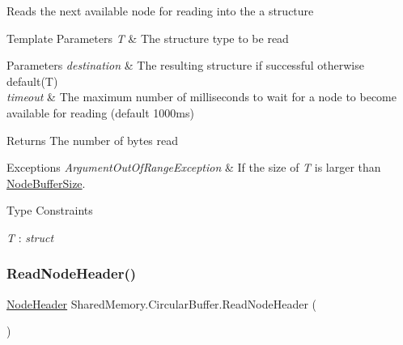 Reads the next available node for reading into the a structure 


\begin{DoxyTemplParams}{Template Parameters}
{\em T} & The structure type to be read\\
\hline
\end{DoxyTemplParams}

\begin{DoxyParams}{Parameters}
{\em destination} & The resulting structure if successful otherwise default(\+T)\\
\hline
{\em timeout} & The maximum number of milliseconds to wait for a node to become available for reading (default 1000ms)\\
\hline
\end{DoxyParams}
\begin{DoxyReturn}{Returns}
The number of bytes read
\end{DoxyReturn}

\begin{DoxyExceptions}{Exceptions}
{\em Argument\+Out\+Of\+Range\+Exception} & If the size of {\itshape T}  is larger than \hyperlink{class_shared_memory_1_1_circular_buffer_a25a6c6b560e818ef1ba6d645e0e14018}{Node\+Buffer\+Size}.\\
\hline
\end{DoxyExceptions}
\begin{Desc}
\item[Type Constraints]\begin{description}
\item[{\em T} : {\em struct}]\end{description}
\end{Desc}
\mbox{\label{class_shared_memory_1_1_circular_buffer_ad2c91fdb5a0fab9e89a2398a05354681}} 
\subsubsection{\texorpdfstring{Read\+Node\+Header()}{ReadNodeHeader()}}
{\footnotesize\ttfamily \hyperlink{struct_shared_memory_1_1_circular_buffer_1_1_node_header}{Node\+Header} Shared\+Memory.\+Circular\+Buffer.\+Read\+Node\+Header (\begin{DoxyParamCaption}{ }\end{DoxyParamCaption})\hspace{0.3cm}{\ttfamily [inline]}}



